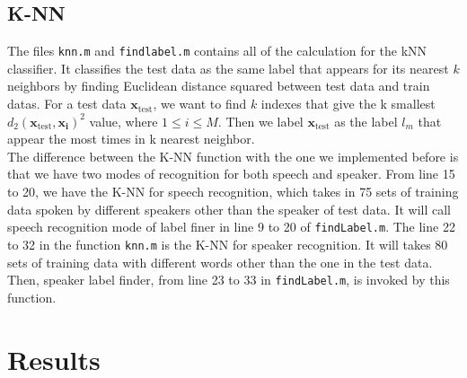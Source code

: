 \documentclass{article}
\begin{document}
	\subsection{K-NN}
	The files \texttt{knn.m} and \texttt{findlabel.m} contains all of the calculation for the kNN classifier. It classifies the test data as the same label that appears for its nearest $k$ neighbors by finding Euclidean distance squared between test data and train datas.
	For a test data $\mathbf{x}_\text{test}$, we want to find $k$ indexes that give the k smallest $d_2(\mathbf{x}_\text{test},\mathbf{x_i})^2$ value, where $1\leq i\leq M$. Then we label $\mathbf{x}_\text{test}$ as the label $l_m$ that appear the most times in k nearest neighbor.\\
	The difference between the K-NN function with the one we implemented before is that we have two modes of recognition for both speech and speaker. From line 15 to 20, we have the K-NN for speech recognition, which takes in 75 sets of training data spoken by different speakers other than the speaker of test data. It will call speech recognition mode of label finer in line 9 to 20 of \texttt{findLabel.m}. The line 22 to 32 in the function \texttt{knn.m} is the K-NN for speaker recognition. It will takes 80 sets of training data with different words other than the one in the test data. Then, speaker label finder, from line 23 to 33 in \texttt{findLabel.m}, is invoked by this function.


	
	
	\section{Results}
	
\end{document}
